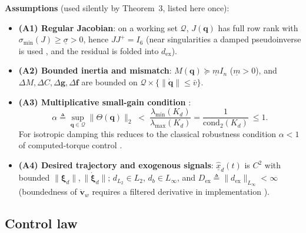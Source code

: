 \textbf{Assumptions} (used silently by Theorem~3, listed here once):
\begin{itemize}[leftmargin=2em]
  \item \textbf{(A1) Regular Jacobian}: on a working set $\mathcal Q$, $J(\boldsymbol q)$ has full row rank with $\sigma_{\min}(J)\ge\underline\sigma>0$, hence $JJ^{+}=I_6$ (near singularities a damped pseudoinverse is used \cite{Nak86}, and the residual is folded into $d_{\mathrm{ex}}$).
  \item \textbf{(A2) Bounded inertia and mismatch}: $M(\boldsymbol q)\succeq \underline m I_n$ ($\underline m>0$), and $\Delta M,\Delta C,\Delta\boldsymbol g,\Delta\boldsymbol f$ are bounded on $\mathcal Q\times\{\|\dot{\boldsymbol q}\|\le\bar v\}$.
  \item \textbf{(A3) Multiplicative small-gain condition} \cite{ZDG96}:
  \begin{equation}
  \alpha\triangleq\sup_{\boldsymbol q\in\mathcal Q}\bigl\|\Theta(\boldsymbol q)\bigr\|_2
  \;<\;\frac{\lambda_{\min}(K_d)}{\lambda_{\max}(K_d)}=\frac1{\mathrm{cond}_2(K_d)}\ \le 1 .
  \tag{5.1f}\label{eq:5.1f}
  \end{equation}
  For isotropic damping this reduces to the classical robustness condition $\alpha<1$ of computed-torque control \cite{Spo92}.
  \item \textbf{(A4) Desired trajectory and exogenous signals}: $\hat{\underline x}_d(t)$ is $C^2$ with bounded $\|\boldsymbol\xi_d\|,\|\dot{\boldsymbol\xi}_d\|$; $d_{L_2}\in L_2$, $d_b\in L_\infty$, and $D_{\mathrm{ex}}\triangleq\|d_{\mathrm{ex}}\|_{L_\infty}<\infty$ (boundedness of $\dot{\boldsymbol v}_w$ requires a filtered derivative in implementation \cite{Ber93}).
\end{itemize}

\subsection{Control law}

